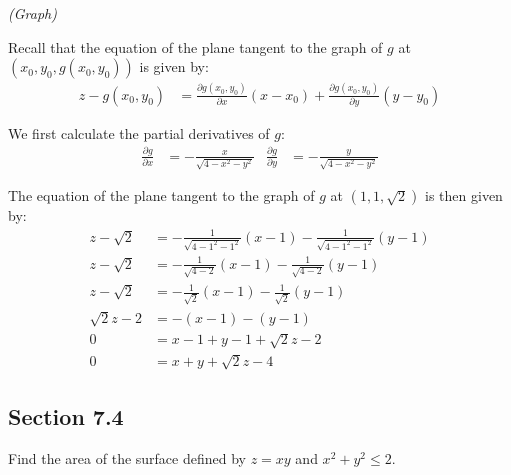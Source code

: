\begin{solution}
\textit{(Graph)}
    
    Recall that the equation of the plane tangent to the graph of \(g\) at \((x_0, y_0, g(x_0, y_0))\) is given by:
    \begin{align}
        z - g(x_0, y_0) &= \frac{\partial g(x_0, y_0)}{\partial x}(x - x_0) + \frac{\partial g(x_0, y_0)}{\partial y}(y - y_0)
    \end{align}
    
    We first calculate the partial derivatives of \(g\):
    \begin{align*}
        \frac{\partial g}{\partial x} &= -\frac{x}{\sqrt{4 - x^2 - y^2}} & \frac{\partial g}{\partial y} &= -\frac{y}{\sqrt{4 - x^2 - y^2}}
    \end{align*}
    
    The equation of the plane tangent to the graph of \(g\) at \((1, 1, \sqrt{2})\) is then given by:
    \begin{align*}
        z - \sqrt{2} &= -\frac{1}{\sqrt{4 - 1^2 - 1^2}}(x - 1) -\frac{1}{\sqrt{4 - 1^2 - 1^2}}(y - 1) \\
        z - \sqrt{2} &= -\frac{1}{\sqrt{4 - 2}}(x - 1) -\frac{1}{\sqrt{4 - 2}}(y - 1) \\
        z - \sqrt{2} &= -\frac{1}{\sqrt{2}}(x - 1) -\frac{1}{\sqrt{2}}(y - 1) \\
        \sqrt{2} z - 2 &= -(x - 1) -(y - 1) \\
        0 &= x - 1 + y - 1 + \sqrt{2} z - 2 \\
        0 &= x + y + \sqrt{2} z - 4
    \end{align*}
\end{solution}

\subsection{Section 7.4}

\begin{tcolorbox}[
        title={Problem 6},
        valign=center,
        nobeforeafter,
        colframe=gray!95!black
    ]
    Find the area of the surface defined by \(z = xy\) and \(x^2 + y^2 \leq 2\).
\end{tcolorbox}

